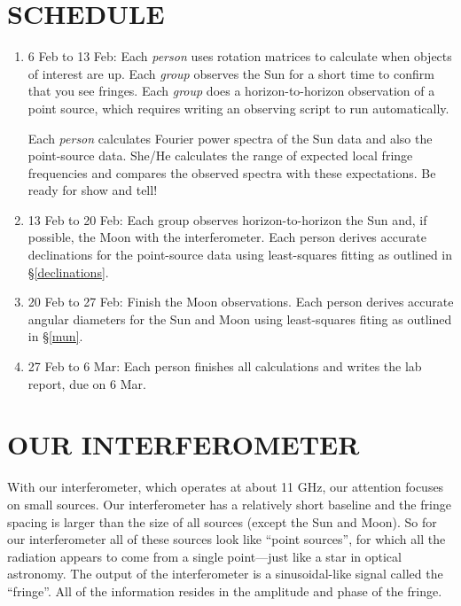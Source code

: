 \documentclass[11pt,preprint]{aastex}
\begin{document}
\section{SCHEDULE}

\begin{enumerate}

\item 6 Feb to 13 Feb: Each {\it person} uses rotation matrices to
calculate when objects of interest are up. Each {\it group} observes the
Sun for a short time to confirm that you see fringes. Each {\it group}
does a horizon-to-horizon observation of a point source, which requires
writing an observing script to run automatically.

Each {\it person} calculates Fourier power spectra of the Sun data and
also the point-source data. She/He calculates the range of expected
local fringe frequencies and compares the observed spectra with these
expectations. Be ready for show and tell!

\item 13 Feb to 20 Feb: Each group observes horizon-to-horizon the Sun
  and, if possible, the Moon with the interferometer.  Each person
  derives accurate declinations for the point-source data using
  least-squares fitting as outlined in \S \ref{declinations}.

\item 20 Feb to 27 Feb: Finish the Moon observations. Each person
  derives accurate angular diameters for the Sun and Moon using
  least-squares fiting as outlined in \S \ref{mun}. 

\item 27 Feb to 6 Mar: Each person finishes all calculations and
writes the lab report, due on 6 Mar.

\end{enumerate}

\section{OUR INTERFEROMETER}

	With our interferometer, which operates at about 11 GHz, our
attention focuses on small sources.  Our interferometer has a relatively
short baseline and the fringe spacing is larger than the size of all
sources (except the Sun and Moon).  So for our interferometer all of
these sources look like ``point sources'', for which all the radiation
appears to come from a single point---just like a star in optical
astronomy.  The output of the interferometer is a sinusoidal-like signal
called the ``fringe''. All of the information resides in the amplitude
and phase of the fringe.
\end{document}
